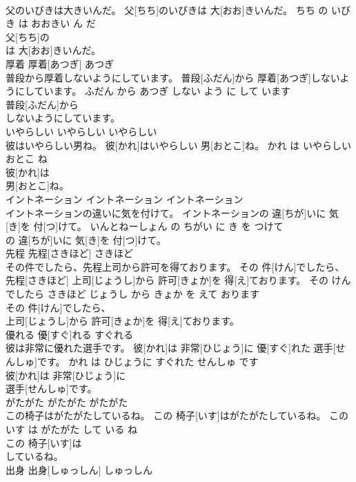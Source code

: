 \documentclass[8pt]{extreport}
\begin{document}
\begin{CJK}{UTF8}{min}
\\	父のいびきは大きいんだ。	父[ちち]のいびきは 大[おお]きいんだ。	ちち の いびき は おおきい ん だ	
\\	父[ちち]の
\\	は 大[おお]きいんだ。			
\\	厚着	厚着[あつぎ]	あつぎ	
\\	普段から厚着しないようにしています。	普段[ふだん]から 厚着[あつぎ]しないようにしています。	ふだん から あつぎ しない よう に して います	
\\	普段[ふだん]から
\\	しないようにしています。			
\\	いやらしい	いやらしい	いやらしい	
\\	彼はいやらしい男ね。	彼[かれ]はいやらしい 男[おとこ]ね。	かれ は いやらしい おとこ ね	
\\	彼[かれ]は
\\	男[おとこ]ね。			
\\	イントネーション	イントネーション	イントネーション	
\\	イントネーションの違いに気を付けて。	イントネーションの 違[ちが]いに 気[き]を 付[つ]けて。	いんとねーしょん の ちがい に き を つけて	
\\	の 違[ちが]いに 気[き]を 付[つ]けて。			
\\	先程	先程[さきほど]	さきほど	
\\	その件でしたら、先程上司から許可を得ております。	その 件[けん]でしたら、 先程[さきほど] 上司[じょうし]から 許可[きょか]を 得[え]ております。	その けん でしたら さきほど じょうし から きょか を えて おります	
\\	その 件[けん]でしたら、
\\	上司[じょうし]から 許可[きょか]を 得[え]ております。			
\\	優れる	優[すぐ]れる	すぐれる	
\\	彼は非常に優れた選手です。	彼[かれ]は 非常[ひじょう]に 優[すぐ]れた 選手[せんしゅ]です。	かれ は ひじょうに すぐれた せんしゅ です	
\\	彼[かれ]は 非常[ひじょう]に
\\	選手[せんしゅ]です。			
\\	がたがた	がたがた	がたがた	
\\	この椅子はがたがたしているね。	この 椅子[いす]はがたがたしているね。	この いす は がたがた して いる ね	
\\	この 椅子[いす]は
\\	しているね。			
\\	出身	出身[しゅっしん]	しゅっしん	

\end{CJK}
\end{document}
